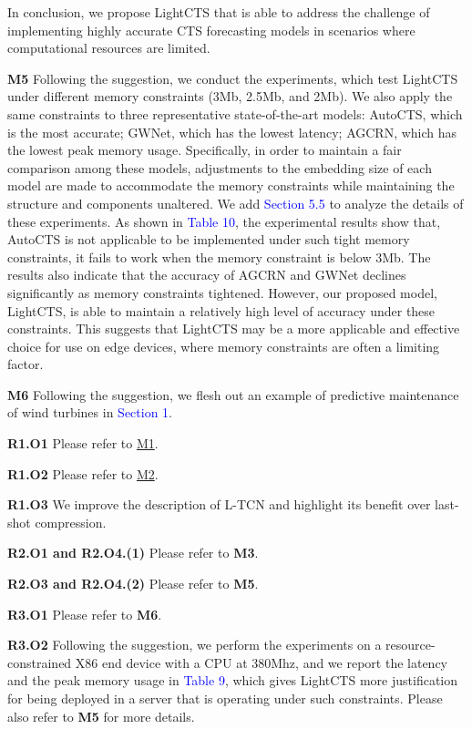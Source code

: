 \documentclass[sigconf,screen,anonymous=false]{acmart}
\newcommand{\where}[1]{{\textcolor{blue}{#1}}}
\begin{document}
In conclusion, we propose LightCTS that is able to address the challenge of implementing highly accurate CTS forecasting models in scenarios where computational resources are limited. 




\noindent
\textbf{M5} Following the suggestion, we conduct the experiments, which test LightCTS under different memory constraints (3Mb, 2.5Mb, and 2Mb). We also apply the same constraints to three representative state-of-the-art models: AutoCTS, which is the most accurate; GWNet, which has the lowest latency; AGCRN, which has the lowest peak memory usage. Specifically, in order to maintain a fair comparison among these models, adjustments to the embedding size  of each model are made to accommodate the memory constraints while maintaining the structure and components unaltered. We add \where{Section 5.5} to analyze the details of these experiments. As shown in \where{Table 10}, the experimental results show that, AutoCTS is not applicable to be implemented under such tight memory constraints, it fails to work when the memory constraint is below 3Mb. The results also indicate that the accuracy of AGCRN and GWNet declines significantly as memory constraints tightened. However, our proposed model, LightCTS, is able to maintain a relatively high level of accuracy under these constraints. This suggests that LightCTS may be a more applicable and effective choice for use on edge devices, where memory constraints are often a limiting factor.


\noindent
\textbf{M6} Following the suggestion, we flesh out an example of predictive maintenance of wind turbines in \where{Section 1}.






\noindent
\textbf{R1.O1}\label{R1O1}
Please refer to \hyperref[M1]{M1}.

\noindent
\textbf{R1.O2} Please refer to \hyperref[M2]{M2}.

\noindent
\textbf{R1.O3}
We improve the description of L-TCN and highlight its benefit over last-shot compression.

\noindent
\textbf{R2.O1 and R2.O4.(1)} Please refer to \textbf{M3}.

\noindent
\textbf{R2.O3 and R2.O4.(2)} Please refer to \textbf{M5}.

\noindent
\textbf{R3.O1} Please refer to \textbf{M6}.

\noindent
\textbf{R3.O2} Following the suggestion, we perform the experiments on a resource-constrained X86 end device with a CPU at 380Mhz, and we report the latency and the peak memory usage in \where{Table 9}, which gives LightCTS more justification for being deployed in a server that is operating under such constraints. Please also refer to \textbf{M5} for more details.

\clearpage
\balance
\end{document}
